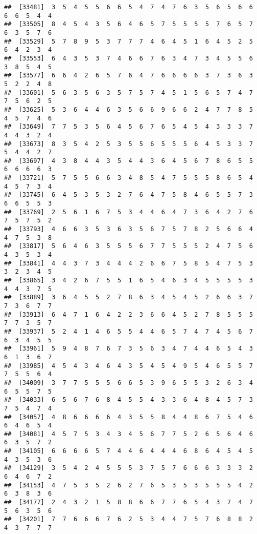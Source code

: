 \documentclass[
]{book}
\begin{document}
\begin{verbatim}
##  [33481]  3  5  4  5  5  6  6  5  4  7  4  7  6  3  5  6  5  6  6  6  6  5  4  4
##  [33505]  8  4  5  4  3  5  6  4  6  5  7  5  5  5  5  7  6  5  7  6  3  5  7  6
##  [33529]  5  7  8  9  5  3  7  7  7  4  6  4  5  1  6  4  5  2  5  6  4  2  3  4
##  [33553]  6  4  3  5  3  7  4  6  6  7  6  3  4  7  3  4  5  5  6  3  8  5  4  5
##  [33577]  6  6  4  2  6  5  7  6  4  7  6  6  6  6  3  7  3  6  3  5  2  2  4  8
##  [33601]  5  6  3  5  6  3  5  7  5  7  4  5  1  5  6  5  7  4  7  7  5  6  2  5
##  [33625]  5  3  6  4  4  6  3  5  6  6  9  6  6  2  4  7  7  8  5  4  5  7  4  6
##  [33649]  7  7  5  3  5  6  4  5  6  7  6  5  4  5  4  3  3  3  7  4  4  3  2  4
##  [33673]  8  3  5  4  2  5  3  5  5  6  5  5  5  6  4  5  3  3  7  5  4  4  2  7
##  [33697]  4  3  8  4  4  3  5  4  4  3  6  4  5  6  7  8  6  5  5  6  6  6  6  3
##  [33721]  5  7  5  5  6  6  3  4  8  5  4  7  5  5  5  8  6  5  4  4  5  7  3  4
##  [33745]  6  4  5  3  5  3  2  7  6  4  7  5  8  4  6  5  5  7  3  6  6  5  5  3
##  [33769]  2  5  6  1  6  7  5  3  4  4  6  4  7  3  6  4  2  7  6  7  5  7  5  2
##  [33793]  4  6  6  3  5  3  6  3  5  6  7  5  7  8  2  5  6  6  4  4  7  5  3  8
##  [33817]  5  6  4  6  3  5  5  5  6  7  7  5  5  5  2  4  7  5  6  4  3  5  3  4
##  [33841]  4  4  3  7  3  4  4  4  2  6  6  7  5  8  5  4  7  5  3  3  2  3  4  5
##  [33865]  3  4  2  6  7  5  5  1  6  5  4  6  3  4  5  5  5  5  3  4  4  3  7  5
##  [33889]  3  6  4  5  5  2  7  8  6  3  4  5  4  5  2  6  6  3  7  7  3  6  7  7
##  [33913]  6  4  7  1  6  4  2  2  3  6  6  4  5  2  7  8  5  5  5  7  7  3  5  7
##  [33937]  5  2  4  1  4  6  5  5  4  4  6  5  7  4  7  4  5  6  7  6  3  4  5  5
##  [33961]  5  9  4  8  7  6  7  3  5  6  3  4  7  4  4  6  5  4  3  6  1  3  6  7
##  [33985]  4  5  4  3  4  6  4  3  5  4  5  4  9  5  4  6  5  5  7  7  5  5  6  4
##  [34009]  3  7  7  5  5  5  6  6  5  3  9  6  5  5  3  2  6  3  4  6  5  5  7  5
##  [34033]  6  5  6  7  6  8  4  5  5  4  3  3  6  4  8  4  5  7  3  7  5  4  7  4
##  [34057]  4  8  6  6  6  6  4  3  5  5  8  4  4  8  6  7  5  4  6  6  4  6  5  4
##  [34081]  4  5  7  5  3  4  3  4  5  6  7  7  5  2  6  5  6  4  6  6  3  5  7  2
##  [34105]  6  6  6  6  5  7  4  4  6  4  4  4  6  8  6  4  5  4  5  4  3  5  3  6
##  [34129]  3  5  4  2  4  5  5  5  3  7  5  7  6  6  6  3  3  3  2  6  4  6  7  2
##  [34153]  4  7  5  3  5  2  6  2  7  6  5  3  5  3  5  5  5  4  2  6  3  8  3  6
##  [34177]  2  4  3  2  1  5  8  8  6  6  7  7  6  5  4  3  7  4  7  5  6  3  5  6
##  [34201]  7  7  6  6  6  7  6  2  5  3  4  4  7  5  7  6  8  8  2  4  3  7  7  7

\end{verbatim}
\end{document}

